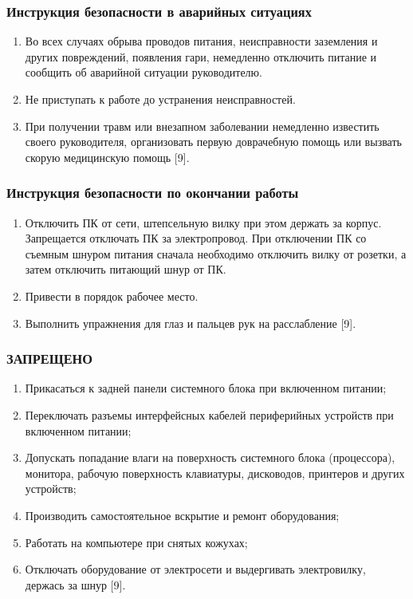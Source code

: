 \subsubsection{Инструкция безопасности в аварийных ситуациях}

\begin{enumerate}
 \item Во всех случаях обрыва проводов питания, неисправности заземления и других повреждений, появления гари, немедленно отключить питание и сообщить об аварийной ситуации руководителю.
 \item Не приступать к работе до устранения неисправностей.
 \item При получении травм или внезапном заболевании немедленно известить своего руководителя, организовать первую доврачебную помощь или вызвать скорую медицинскую помощь [9].
\end{enumerate}

\subsubsection{Инструкция безопасности по окончании работы}

\begin{enumerate}
 \item Отключить ПК от сети, штепсельную вилку при этом держать за корпус. Запрещается отключать ПК за электропровод. При отключении ПК со съемным шнуром питания сначала необходимо отключить вилку от розетки, а затем отключить питающий шнур от ПК.
 \item Привести в порядок рабочее место.
 \item Выполнить упражнения для глаз и пальцев рук на расслабление [9].
\end{enumerate}

\subsubsection{ЗАПРЕЩЕНО}

\begin{enumerate}
 \item Прикасаться к задней панели системного блока при включенном питании;
 \item Переключать разъемы интерфейсных кабелей периферийных устройств при включенном питании;
 \item Допускать попадание влаги на поверхность системного блока (процессора), монитора, рабочую поверхность клавиатуры, дисководов, принтеров и других устройств;
 \item Производить самостоятельное вскрытие и ремонт оборудования;
 \item Работать на компьютере при снятых кожухах;
 \item Отключать оборудование от электросети и выдергивать электровилку, держась за шнур [9].
\end{enumerate}
